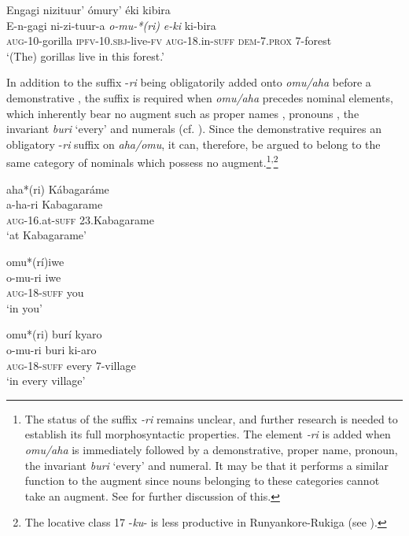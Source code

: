 \documentclass[output=paper 		  ]{langscibook}
\begin{document}
  \ex\label{ex:asiimwe:9b}  Engagi nizituur’ ómury’ éki kibira\\
    \gll E-n-gagi  ni-zi-tuur-a  \emph{o-mu-*(ri)}  \emph{e-ki}  ki-bira\\
    \textsc{aug}{}-10-gorilla  \textsc{ipfv-10.sbj-}live\textsc{{}-fv}  \textsc{aug-}18.in-\textsc{suff}  \textsc{dem}{}-7.\textsc{prox}  7-forest\\
  \glt ‘(The) gorillas live in this forest.’
  \z
\z

In addition to the suffix -\textit{ri} being obligatorily added onto \textit{omu/aha} before a demonstrative , the suffix is required when \textit{omu/aha} precedes nominal elements, which inherently bear no augment such as proper names , pronouns , the invariant \textit{buri} ‘every’  and numerals  (cf. \citealt[88--89]{Taylor1985}). Since the demonstrative requires an obligatory -\textit{ri} suffix on \textit{aha/omu}, it can, therefore, be argued to belong to the same category of nominals which possess no augment.\footnote{The status of the suffix \textit{-ri} remains unclear, and further research is needed to establish its full morphosyntactic properties. The element \textit{-ri} is added when \textit{omu/aha} is immediately followed by a demonstrative, proper name, pronoun, the invariant \textit{buri} ‘every’ and numeral. It may be that it performs a similar function to the augment since nouns belonging to these categories cannot take an augment. See \citet{BeermannAsiimweForthcoming} for further discussion of this.}\textsuperscript{,}\footnote{The locative class 17 -\textit{ku}- is less productive in Run\-yan\-ko\-re-Ru\-ki\-ga (see \citealt{BeermannAsiimweForthcoming}).}

\ea%
    \label{ex:asiimwe:10}
    \ea\label{ex:asiimwe:10a}  aha*(ri) Kábagaráme\\
    \gll a-ha-ri  Kabagarame\\
    \textsc{aug}{}-16.at-\textsc{suff}  23.Kabagarame\\
    \glt ‘at Kabagarame’

    \ex\label{ex:asiimwe:10b}  omu*(rí)iwe\\
  \gll o-mu-ri  iwe\\
  \textsc{aug-18-suff}  you\\
  \glt ‘in you’

    \ex\label{ex:asiimwe:10c}  omu*(ri) burí kyaro\\
  \gll o-mu-ri  buri  ki-aro\\
\textsc{aug-18-suff}  every  7-village\\
    \glt ‘in every village’
\end{document}
